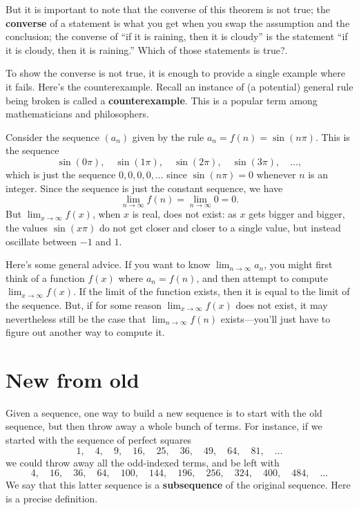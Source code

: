 \documentclass{ximera}
\newcommand{\defnword}[1]{\textbf{#1}}
\renewcommand{\index}[1]{}
\begin{document}
But it is important to note that the converse of this theorem is not
true; \label{sidenote:raining-converse}the \defnword{converse} of a
statement is what you get when you swap the assumption and the
conclusion; the converse of ``if it is raining, then it is cloudy'' is
the statement ``if it is cloudy, then it is raining.''  Which of those
statements is true?.

To show the converse is not true, it is enough to provide a single
example where it fails.  Here's the counterexample.  Recall an
instance of (a potential) general rule being broken is called a
\defnword{counterexample}.  This is a popular term among
mathematicians and philosophers.

\begin{example}
  Consider the sequence $(a_n)$ given by the rule $a_n = f(n)=\sin(n\pi)$.  This is the sequence
$$
  \sin(0\pi),\quad \sin(1\pi),\quad\sin(2\pi),\quad\sin(3\pi),\quad\ldots,
$$
which is just the sequence $0, 0, 0, 0, \ldots$ since $\sin(n\pi)=0$
whenever $n$ is an integer.  Since the sequence is just the constant sequence, we have
$$
\lim_{n\to\infty} f(n)= \lim_{n\to\infty} 0 = 0. 
$$But $\displaystyle\lim_{x\to\infty}f(x)$, when $x$ is real, does not exist: as $x$ gets
bigger and bigger, the values $\sin(x\pi)$ do not get closer and
closer to a single value, but instead oscillate between $-1$ and $1$.
\end{example} 

Here's some general advice. If you want to know $\displaystyle\lim_{n\to\infty}
a_n$, you might first think of a function $f(x)$ where $a_n = f(n)$,
and then attempt to compute $\displaystyle\lim_{x\to\infty}f(x)$.  If the limit
of the function exists, then it is equal to the limit of the sequence.
But, if for some reason $\displaystyle\lim_{x\to\infty}f(x)$ does not exist, it
may nevertheless still be the case that $\displaystyle\lim_{n\to\infty}f(n)$
exists---you'll just have to figure out another way to compute it.


\section{New from old}

Given a sequence, one way to build a new sequence is to start with the
old sequence, but then throw away a whole bunch of terms.  For
instance, if we started with the sequence of perfect squares
$$
1,\quad 4,\quad 9,\quad 16,\quad 25,\quad 36,\quad 49,\quad 64,\quad 81,\quad\ldots
$$
we could throw away all the odd-indexed terms, and be left with
$$
4,\quad 16,\quad 36,\quad 64,\quad 100,\quad 144,\quad 196,\quad 256,\quad 324,\quad 400,\quad 484,\quad\ldots
$$
We say that this latter sequence is a
\defnword{subsequence}\index{sequence!subsequence}\index{subsequence}
of the original sequence.  Here is a precise definition.
\end{document}

